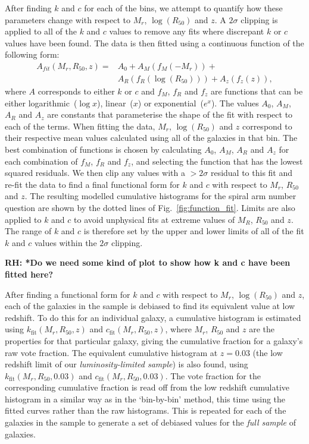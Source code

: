 \documentclass[useAMS,usenatbib]{mn2e}
\newcommand{\rh}[1]{{\bf \textcolor{RoyalPurple}{RH: #1}}}
\begin{document}
After finding $k$ and $c$ for each of the bins, we attempt to quantify how these parameters change with respect to $M_r$, $\log(R_{50})$ and $z$. A $2\sigma$ clipping is applied to all of the $k$ and $c$ values to remove any fits where discrepant $k$ or $c$ values have been found. The data is then fitted using a continuous function of the following form:
\begin{equation}
\begin{split}
A_{fit}(M_r,R_{50},z) = & A_0 + A_M(f_M(-M_r)) +\\
						& A_R(f_R(\log({R_{50}}))) + A_z(f_z(z)) \mathrm{,}
\end{split}
\end{equation}
where $A$ corresponds to either $k$ or $c$ and $f_M$, $f_R$ and $f_z$ are functions that can be either logarithmic~($\log x$), linear~($x$) or exponential~($e^x$). The values $A_0$, $A_M$, $A_R$ and $A_z$ are constants that parameterise the shape of the fit with respect to each of the terms. When fitting the data, $M_r$, $\log(R_{50})$ and $z$ correspond to their respective mean values calculated using all of the galaxies in that bin. The best combination of functions is chosen by calculating $A_0$, $A_M$, $A_R$ and $A_z$ for each combination of $f_M$, $f_R$ and $f_z$, and selecting the function that has the lowest squared residuals. We then clip any values with a $>2\sigma$ residual to this fit and re-fit the data to find a final functional form for $k$ and $c$ with respect to $M_r$, $R_{50}$ and $z$. The resulting modelled cumulative histograms for the spiral arm number question are shown by the dotted lines of Fig.~\ref{fig:function_fit}. Limits are also applied to $k$ and $c$ to avoid unphysical fits at extreme values of $M_R$, $R_{50}$ and $z$. The range of $k$ and $c$ is therefore set by the upper and lower limits of all of the fit $k$ and $c$ values within the $2\sigma$ clipping.

\rh{*Do we need some kind of plot to show how k and c have been fitted here?}

After finding a functional form for $k$ and $c$ with respect to $M_r$, $\log(R_{50})$ and $z$, each of the galaxies in the sample is debiased to find its equivalent value at low redshift. To do this for an individual galaxy, a cumulative histogram is estimated using $k_{\mathrm{fit}}(M_r,R_{50},z)$ and $c_{\mathrm{fit}}(M_r,R_{50},z)$, where $M_r$, $R_{50}$ and $z$ are the properties for that particular galaxy, giving the cumulative fraction for a galaxy's raw vote fraction. The equivalent cumulative histogram at $z=0.03$ (the low redshift limit of our \textit{luminosity-limited sample}) is also found, using $k_{\mathrm{fit}}(M_r,R_{50},0.03)$ and $c_{\mathrm{fit}}(M_r,R_{50},0.03)$. The vote fraction for the corresponding cumulative fraction is read off from the low redshift cumulative histogram in a similar way as in the `bin-by-bin' method, this time using the fitted curves rather than the raw histograms. This is repeated for each of the galaxies in the sample to generate a set of debiased values for the \textit{full sample} of galaxies.
\end{document}
